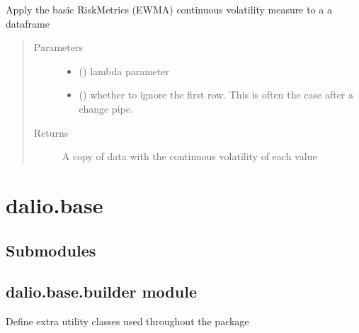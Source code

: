 \documentclass[letterpaper,10pt,english]{sphinxmanual}
\begin{document}
\begin{fulllineitems}
\label{\detokenize{dalio.ops:dalio.ops.risk_metrics}}
Apply the basic RiskMetrics (EWMA) continuous volatility measure to a
a dataframe
\begin{quote}\begin{description}
\item[{Parameters}] \leavevmode\begin{itemize}
\item {} 
 () \textendash{} lambda parameter

\item {} 
 () \textendash{} whether to ignore the first row. This is often
the case after a change pipe.

\end{itemize}

\item[{Returns}] \leavevmode
A copy of data with the continuous volatility of each value

\end{description}\end{quote}

\end{fulllineitems}



\chapter{dalio.base}
\label{\detokenize{dalio.base:dalio-base}}\label{\detokenize{dalio.base::doc}}

\section{Submodules}
\label{\detokenize{dalio.base:submodules}}

\section{dalio.base.builder module}
\label{\detokenize{dalio.base:module-dalio.base.builder}}\label{\detokenize{dalio.base:dalio-base-builder-module}}
Define extra utility classes used throughout the package
\end{document}
